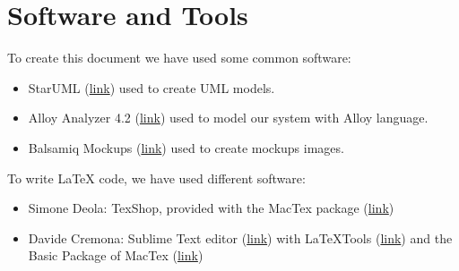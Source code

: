 \section{Software and Tools}
To create this document we have used some common software:
	\begin{itemize}
		\item StarUML (\href{http://staruml.io}{link}) used to create UML models.
		\item Alloy Analyzer 4.2 (\href{http://alloy.mit.edu/alloy/index.html}{link}) used to model our system with Alloy language.
		\item Balsamiq Mockups (\href{http://balsamiq.com/products/mockups/}{link}) used to create mockups images.
	\end{itemize}

To write LaTeX code, we have used different software:
	\begin{itemize}
		\item Simone Deola: TexShop, provided with the MacTex package (\href{https://tug.org/mactex/}{link})
		\item Davide Cremona: Sublime Text editor (\href{http://www.sublimetext.com}{link}) with LaTeXTools (\href{https://github.com/SublimeText/LaTeXTools}{link}) and the Basic Package of MacTex (\href{https://tug.org/mactex/}{link})
	\end{itemize}